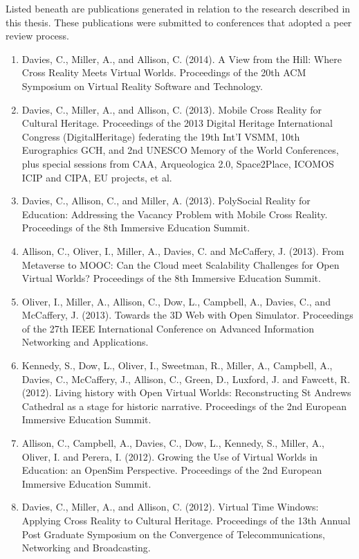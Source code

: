Listed beneath are publications generated in relation to the research described in this thesis. These publications were submitted to conferences that adopted a peer review process.

\begin{enumerate}

	\item Davies, C., Miller, A., and Allison, C. (2014). A View from the Hill: Where Cross Reality Meets Virtual Worlds.  Proceedings of the 20th ACM Symposium on Virtual Reality Software and Technology.

	\item Davies, C., Miller, A., and Allison, C. (2013). Mobile Cross Reality for Cultural Heritage. Proceedings of the 2013 Digital Heritage International Congress (DigitalHeritage) federating the 19th Int'I VSMM, 10th Eurographics GCH, and 2nd UNESCO Memory of the World Conferences, plus special sessions from CAA, Arqueologica 2.0, Space2Place, ICOMOS ICIP and CIPA, EU projects, et al.

	\item Davies, C., Allison, C., and Miller, A. (2013). PolySocial Reality for Education: Addressing the Vacancy Problem with Mobile Cross Reality. Proceedings of the 8th Immersive Education Summit.

	\item Allison, C., Oliver, I., Miller, A., Davies, C. and McCaffery, J. (2013). From Metaverse to MOOC: Can the Cloud meet Scalability Challenges for Open Virtual Worlds? Proceedings of the 8th Immersive Education Summit.

	\item Oliver, I., Miller, A., Allison, C., Dow, L., Campbell, A., Davies, C., and McCaffery, J. (2013). Towards the 3D Web with Open Simulator. Proceedings of the 27th IEEE International Conference on Advanced Information Networking and Applications.

	\item Kennedy, S., Dow, L., Oliver, I., Sweetman, R., Miller, A., Campbell, A., Davies, C., McCaffery, J., Allison, C., Green, D., Luxford, J. and Fawcett, R. (2012). Living history with Open Virtual Worlds: Reconstructing St Andrews Cathedral as a stage for historic narrative. Proceedings of the 2nd European Immersive Education Summit.

	\item Allison, C., Campbell, A., Davies, C., Dow, L., Kennedy, S., Miller, A., Oliver, I. and Perera, I. (2012). Growing the Use of Virtual Worlds in Education: an OpenSim Perspective. Proceedings of the 2nd European Immersive Education Summit.

	\item Davies, C., Miller, A., and Allison, C. (2012). Virtual Time Windows: Applying Cross Reality to Cultural Heritage. Proceedings of the 13th Annual Post Graduate Symposium on the Convergence of Telecommunications, Networking and Broadcasting.

\end{enumerate}
